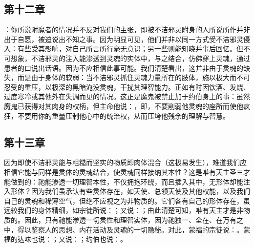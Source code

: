 \subsection{第十二章}

\par

：你所说附魔者的情况并不反对我们的主张，即被不洁邪灵附身的人所说所作并非出于自愿，被迫说出不知之事。因为明显可见，他们并非以同一方式受不洁邪灵侵入：有些受其影响，对自己所言所行毫无意识；另一些则能知晓并事后回忆。但不可想象，不洁邪灵的注入能渗透到灵魂的实体中，与之结合，仿佛穿上灵魂，通过患者的口说出话语。因为不应相信此事可能。我们清楚看出，这并非由于灵魂的缺失，而是由于身体的软弱：当不洁邪灵抓住灵魂力量所在的肢体，施以极大而不可忍受的重压，以极深的黑暗淹没灵魂，干扰其理智能力。正如有时因饮酒、发烧、过度寒冷或其他外在失调而见的情况。这正是魔鬼被禁止加于约伯身上的事：虽然魔鬼已获得对其肉身的权柄，但主命他说：，即，不要削弱他灵魂的座所而使他疯狂，不要用你的重量压制他心中的统治权，从而压垮他残余的理解与智慧。\par


\subsection{第十三章}

\par

因为即使不洁邪灵能与粗糙而坚实的物质即肉体混合（这极易发生），难道我们应相信它能与同样是灵体的灵魂结合，使灵魂同样接纳其本性？这是唯有天主圣三才能做到的：祂能渗透一切理智本性，不仅拥抱环绕，而且插入其中，无形体却能注入形体？因为我们虽承认有些灵体存在，如天使、总领天使及其他权能，以及我们自己的灵魂和稀薄空气，但绝不应视之为非物质的。它们各有自己的形体存在，虽远较我们的身体精细，如宗徒所说：；又说：；由此清楚可知，唯有天主才是非物质的。因此，只有祂能渗透一切灵性和理智实体，因为祂独一、全在、在万有之中，得以鉴察人的思想、内在活动及灵魂的一切隐秘。对此，蒙福的宗徒说：。蒙福的达味也说：；又说：；约伯也说：。\par

